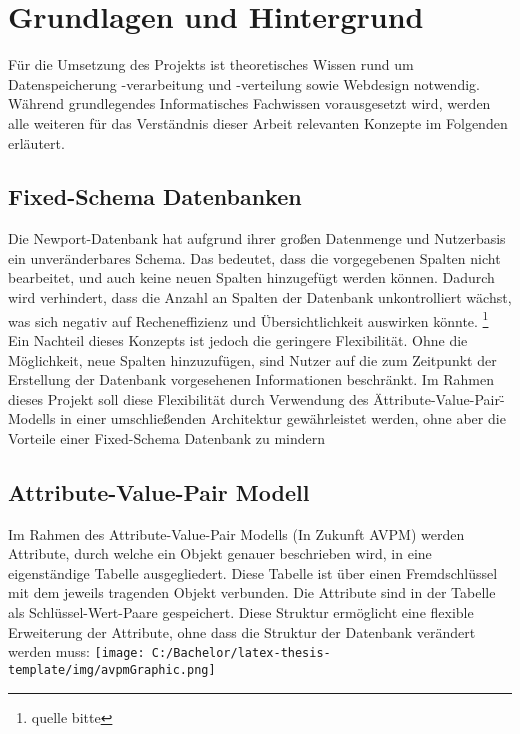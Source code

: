 \section{Grundlagen und Hintergrund}
Für die Umsetzung des Projekts ist theoretisches Wissen rund um Datenspeicherung -verarbeitung und -verteilung 
sowie Webdesign notwendig. Während grundlegendes Informatisches Fachwissen vorausgesetzt wird,
werden alle weiteren für das Verständnis dieser Arbeit relevanten Konzepte im Folgenden erläutert.
\subsection{Fixed-Schema Datenbanken}
Die Newport-Datenbank hat aufgrund ihrer großen Datenmenge und Nutzerbasis ein unveränderbares Schema.
Das bedeutet, dass die vorgegebenen Spalten nicht bearbeitet, und auch keine neuen Spalten hinzugefügt werden können.
Dadurch wird verhindert, dass die Anzahl an Spalten der Datenbank unkontrolliert wächst, was sich negativ auf Recheneffizienz
und Übersichtlichkeit auswirken könnte. \footnote{quelle bitte}
Ein Nachteil dieses Konzepts ist jedoch die geringere Flexibilität. Ohne die Möglichkeit, neue Spalten hinzuzufügen, 
sind Nutzer auf die zum Zeitpunkt der Erstellung der Datenbank vorgesehenen Informationen beschränkt.
Im Rahmen dieses Projekt soll diese Flexibilität durch Verwendung des \"Attribute-Value-Pair\"-Modells in einer umschließenden
Architektur gewährleistet werden, ohne aber die Vorteile einer Fixed-Schema Datenbank zu mindern
\subsection{Attribute-Value-Pair Modell}
Im Rahmen des Attribute-Value-Pair Modells (In Zukunft AVPM) werden Attribute, durch welche ein Objekt genauer beschrieben wird,
in eine eigenständige Tabelle ausgegliedert. Diese Tabelle ist über einen Fremdschlüssel mit dem jeweils tragenden Objekt verbunden.
Die Attribute sind in der Tabelle als Schlüssel-Wert-Paare gespeichert. Diese Struktur ermöglicht eine flexible Erweiterung der Attribute,  
ohne dass die Struktur der Datenbank verändert werden muss: \break
\texttt{[image: C:/Bachelor/latex-thesis-template/img/avpmGraphic.png]}
